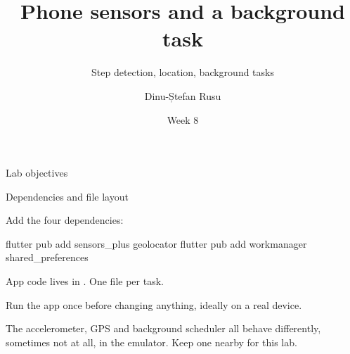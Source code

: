 \documentclass[10pt,aspectratio=169,t]{beamer}
\title{Phone sensors and a background task}
\subtitle{Step detection, location, background tasks}
\author{Dinu-Ștefan Rusu}
\date{Week 8}
\begin{document}
\titleframe

\begin{frame}[eyebrow=Today]{Lab objectives}
  \vskip 2mm
  \begin{grid}[2]
  \end{grid}
  \vskip 6mm
\end{frame}

\begin{frame}[fragile,eyebrow=Setup]{Dependencies and file layout}
  \begin{steps}
    \item Add the four dependencies:
\begin{shell}
flutter pub add sensors_plus geolocator
flutter pub add workmanager shared_preferences
\end{shell}
    \item App code lives in . One file per task.
    \item Run the app once before changing anything, ideally on a real device.
  \end{steps}
  \begin{hint}
    The accelerometer, GPS and background scheduler all behave differently, sometimes not at all, in the emulator. Keep one nearby for this lab.
  \end{hint}
\end{frame}
\end{document}
